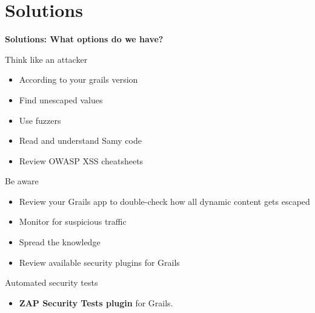 
\section{Solutions}

\begin{frame}[plain]
    \begin{center}
      \Huge\bfseries
      Solutions: What options do we have?
    \end{center}
\end{frame}

\begin{frame}[plain]{Think like an attacker}
  \begin{itemize}
    \item According to your grails version
    \item Find unescaped values
    \item Use fuzzers
    \item Read and understand Samy code
    \item Review OWASP XSS cheatsheets
  \end{itemize}
\end{frame}

\begin{frame}[plain]{Be aware}
  \begin{itemize}
    \item Review your Grails app to double-check how all dynamic content gets escaped
    \item Monitor for suspicious traffic
    \item Spread the knowledge
    \item Review available security plugins for Grails
  \end{itemize}
\end{frame}

\begin{frame}[plain]{Automated security tests}
  \begin{itemize}
    \item \textbf{ZAP Security Tests plugin} for Grails.
  \end{itemize}

  \begin{center}
  \end{center}
\end{frame}

